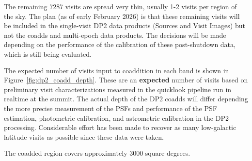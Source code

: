 The remaining 7287 visits are spread very thin, usually 1-2 visits per region of the sky.
The plan (as of early February 2026) is that these remaining visits will be included in the single-visit DP2
data products (Sources and Visit Images) but not the coadds and multi-epoch data products.
The decisions will be made depending on the performance of the calibration of these post-shutdown data,
which is still being evaluated.

The expected number of visits input to coaddition in each band is shown in Figure~\ref{fig:dp2_coadd_depth}.
These are an \textbf{expected} number of visits based on preliminary visit characterizations measured in the quicklook
pipeline run in realtime at the summit.
The actual depth of the DP2 coadds will differ depending the more precise measurement of the PSFs and performance of the
PSF estimation, photometric calibration, and astrometric calibration in the DP2 processing.
Considerable effort has been made to recover as many low-galactic latitude visits as possible since these data were taken.

The coadded region covers approximately 3000 square degrees.

